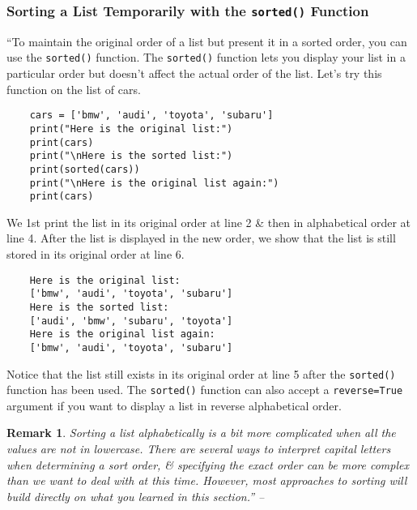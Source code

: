 \documentclass[oneside]{book}
\numberwithin{equation}{section}
\newtheorem{remark}{Remark}[chapter]
\begin{document}
\subsubsection{Sorting a List Temporarily with the \texttt{sorted()} Function}
``To maintain the original order of a list but present it in a sorted order, you can use the \texttt{sorted()} function. The \texttt{sorted()} function lets you display your list in a particular order but doesn't affect the actual order of the list. Let's try this function on the list of cars.
\begin{verbatim}
	cars = ['bmw', 'audi', 'toyota', 'subaru']
	print("Here is the original list:")
	print(cars)
	print("\nHere is the sorted list:")
	print(sorted(cars))
	print("\nHere is the original list again:")
	print(cars)
\end{verbatim}
We 1st print the list in its original order at line 2 \& then in alphabetical order at line 4. After the list is displayed in the new order, we show that the list is still stored in its original order at line 6.
\begin{verbatim}
	Here is the original list:
	['bmw', 'audi', 'toyota', 'subaru']
	Here is the sorted list:
	['audi', 'bmw', 'subaru', 'toyota']
	Here is the original list again:
	['bmw', 'audi', 'toyota', 'subaru']
\end{verbatim}
Notice that the list still exists in its original order at line 5 after the \texttt{sorted()} function has been used. The \texttt{sorted()} function can also accept a \texttt{reverse=True} argument if you want to display a list in reverse alphabetical order.

\begin{remark}
	Sorting a list alphabetically is a bit more complicated when all the values are not in lowercase. There are several ways to interpret capital letters when determining a sort order, \& specifying the exact order can be more complex than we want to deal with at this time. However, most approaches to sorting will build directly on what you learned in this section.'' -- \cite[pp. 44--45]{Matthes2019}
\end{remark}
\end{document}
